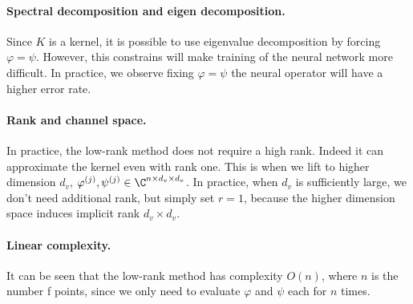 \paragraph{Spectral decomposition and eigen decomposition.}
Since $K$ is a kernel, it is possible to use eigenvalue decomposition by forcing $\varphi = \psi$. However, this constrains will make training of the neural network more difficult. In practice, we observe fixing $\varphi = \psi$ the neural operator will have a higher error rate.

\paragraph{Rank and channel space.}
In practice, the low-rank method does not require a high rank. Indeed it can approximate the kernel even with rank one. This is when we lift to higher dimension $d_v$, $\varphi^{(j)}, \psi^{(j)} \in \C^{n \times d_v \times d_v}$. 
In practice, when $d_v$ is sufficiently large, we don't need additional rank, but simply set $r=1$, because the higher dimension space induces implicit rank $d_v \times d_v$.

\paragraph{Linear complexity.}
It can be seen that the low-rank method has complexity $O(n)$, where $n$ is the number f points, since we only need to evaluate $\varphi$ and $\psi$ each for $n$ times.
\fi
